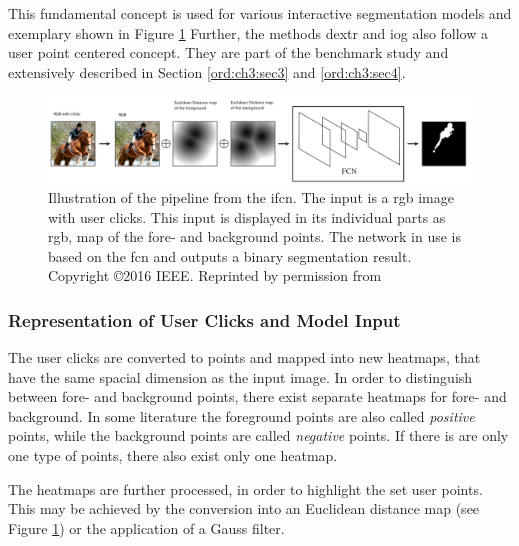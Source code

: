 This fundamental concept is used for various interactive segmentation models \cite{Xu16-InteractiveObjectSelection} \cite{MVL18-ITIS} and exemplary shown in Figure \ref{fig:ch2:sec3:ifcn}
Further, the methods \gls{dextr}  \cite{Man18-DEXTR} and \gls{iog} \cite{Zha20-IOG} also follow a user point centered concept. They are part of the benchmark study and extensively described in Section \ref{ord:ch3:sec3} and \ref{ord:ch3:sec4}.
\begin{figure}
	\includegraphics[width=\linewidth]{figures/chap232_ifcn.png}
	\caption[Interactively Fully Convolutional Network]{
		Illustration of the pipeline from the \gls{ifcn}.
		The input is a \gls{rgb} image with user clicks.
		This input is displayed in its individual parts as \gls{rgb}, map of the fore- and background points.
		The network in use is based on the \gls{fcn} and outputs a binary segmentation result.
		Copyright \copyright 2016 IEEE. Reprinted by permission from \cite{Xu16-InteractiveObjectSelection}
	}\label{fig:ch2:sec3:ifcn}
\end{figure}

\subsubsection{Representation of User Clicks and Model Input}
The user clicks are converted to points and mapped into new heatmaps, that have the same spacial dimension as the input image.
In order to distinguish between fore- and background points, there exist separate heatmaps for fore- and background.
In some literature the foreground points are also called \textit{positive} points, while the background points are called \textit{negative} points.
If there is are only one type of points, there also exist only one heatmap.

The heatmaps are further processed, in order to highlight the set user points.
This may be achieved by the conversion into an Euclidean distance map \cite{Dan80-EuclideanDistanceMapping} (see Figure \ref{fig:ch2:sec3:ifcn}) or the application of a Gauss filter.

